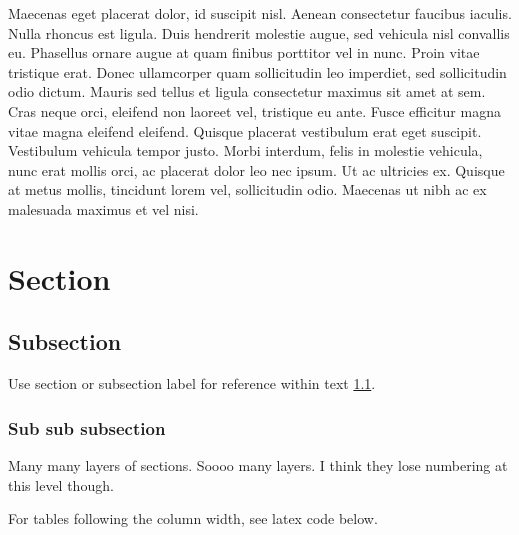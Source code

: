 \begin{multicols}{2}
Maecenas eget placerat dolor, id suscipit nisl. Aenean consectetur faucibus iaculis. Nulla rhoncus est ligula. Duis hendrerit molestie augue, sed vehicula nisl convallis eu. Phasellus ornare augue at quam finibus porttitor vel in nunc. Proin vitae tristique erat. Donec ullamcorper quam sollicitudin leo imperdiet, sed sollicitudin odio dictum. Mauris sed tellus et ligula consectetur maximus sit amet at sem. Cras neque orci, eleifend non laoreet vel, tristique eu ante. Fusce efficitur magna vitae magna eleifend eleifend. Quisque placerat vestibulum erat eget suscipit. Vestibulum vehicula tempor justo. Morbi interdum, felis in molestie vehicula, nunc erat mollis orci, ac placerat dolor leo nec ipsum. Ut ac ultricies ex. Quisque at metus mollis, tincidunt lorem vel, sollicitudin odio. Maecenas ut nibh ac ex malesuada maximus et vel nisi.

\section{Section}

\subsection{Subsection}
\label{subsec:subsectionname2}

Use section or subsection label for reference within text \ref{subsec:subsectionname2}.

\subsubsection{Sub sub subsection}

Many many layers of sections. Soooo many layers. I think they lose numbering at this level though.

For tables following the column width, see latex code below.


\end{multicols}
